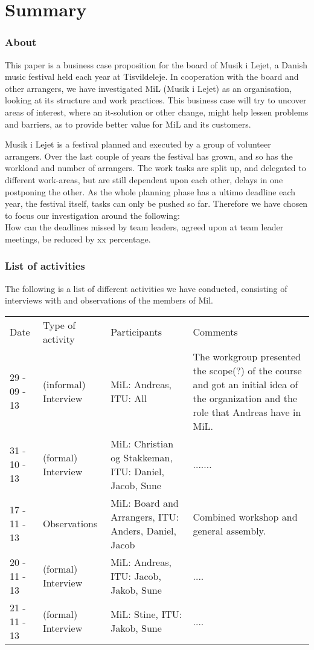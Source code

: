 \part{Summary}

\section{About}
This paper is a business case proposition for the board of Musik i Lejet, a Danish music festival held each year at Tisvildeleje. In cooperation with the board and other arrangers, we have investigated MiL (Musik i Lejet) as an organisation, looking at its structure and work practices. This business case will try to uncover areas of interest, where an it-solution or other change, might help lessen problems and barriers, as to provide better value for MiL and its customers.

Musik i Lejet is a festival planned and executed by a group of volunteer arrangers. Over the last couple of years the festival has grown, and so has the workload and number of arrangers. The work tasks  are split up, and delegated to different work-areas, but are still dependent upon each other, delays in one postponing the other. As the whole planning phase has a ultimo deadline each year, the festival itself, tasks can only be pushed so far. Therefore we have chosen to focus our investigation around the following:\\

How can the deadlines missed by team leaders, agreed upon at team leader meetings, be reduced by xx percentage.

\section{List of activities}
The following is a list of different activities we have conducted, consisting of interviews with and observations of the members of Mil.
\begin{center}
\begin{table}
    \begin{tabular}{|p{3cm}|p{3cm}|p{3cm}|p{6cm}|}
    \hline
    Date & Type of activity & Participants & Comments \\
    29 - 09 - 13 & (informal) Interview & MiL: Andreas, ITU: All & The workgroup presented the scope(?) of the course and got an initial idea of the organization and the role that Andreas have in MiL.  \\
    31 - 10 - 13 & (formal) Interview & MiL: Christian og Stakkeman, ITU: Daniel, Jacob, Sune &  .......  \\
    17 - 11 - 13 & Observations & MiL: Board and Arrangers, ITU: Anders, Daniel, Jacob & Combined workshop and general assembly. \\
    20 - 11 - 13 & (formal) Interview & MiL: Andreas, ITU: Jacob, Jakob, Sune & .... \\
    21 - 11 - 13 & (formal) Interview & MiL: Stine, ITU: Jakob, Sune & .... \\
    \end{tabular}
\end{table}
\end{center}

